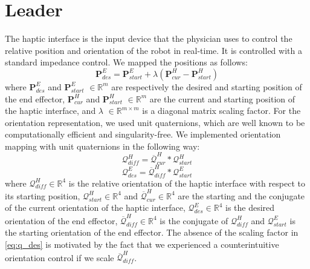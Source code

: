 \section{Leader} 
The haptic interface is the input device that the physician uses to control the relative position and orientation of the robot in real-time. It is controlled with a standard impedance control. We mapped the positions as follows:
\begin{equation}
\boldsymbol{P}^E_{des} = \boldsymbol{P}^E_{start} + \lambda(\boldsymbol{P}^H_{cur} - \boldsymbol{P}^H_{start})
\end{equation}
where $\boldsymbol{P}^E_{des}$ and $\boldsymbol{P}^E_{start}$ $\in \mathbb{R}^{m}$ are respectively the desired and starting position of the end effector, $\boldsymbol{P}^H_{cur}$ and $\boldsymbol{P}^H_{start}$ $\in \mathbb{R}^{m}$ are the current and starting position of the haptic interface, and $\lambda$ $\in \mathbb{R}^{m \times m}$ is a diagonal matrix scaling factor.
For the orientation representation, we used unit quaternions, which are well known to be computationally efficient and singularity-free. We implemented orientation mapping with unit quaternions in the following way:
\begin{equation}
\mathcal{Q}^H_{diff} = \overline{\mathcal{Q}}^H_{cur} * \mathcal{Q}^H_{start}
\end{equation}
\begin{equation}
\mathcal{Q}^E_{des} =\overline{\mathcal{Q}}^H_{diff} * \mathcal{Q}^E_{start}
\label{eq:q_des}
\end{equation}
where $\mathcal{Q}^H_{diff}\in \mathbb{R}^4$ is the relative orientation of the haptic interface with respect to its starting position, $\mathcal{Q}^H_{start}\in \mathbb{R}^4$ and $\overline{\mathcal{Q}}^H_{cur} \in \mathbb{R}^4$ are the starting and the conjugate of the current orientation of the haptic interface, $\mathcal{Q}^E_{des}\in \mathbb{R}^4$ is the desired orientation of the end effector, $\overline{\mathcal{Q}}^H_{diff}\in \mathbb{R}^4$ is the conjugate of $\mathcal{Q}^H_{diff}$ and  $\mathcal{Q}^E_{start}$ is the starting orientation of the end effector. The absence of the scaling factor in \eqref{eq:q_des} is motivated by the fact that we experienced a counterintuitive orientation control if we scale $\overline{\mathcal{Q}}^H_{diff}$.

